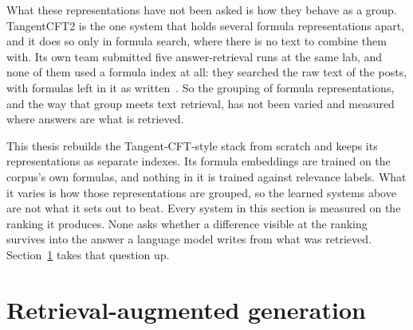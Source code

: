 What these representations have not been asked is how they behave as a group.
TangentCFT2 is the one system that holds several formula representations apart, and it
does so only in formula search, where there is no text to combine them with. Its own
team submitted five answer-retrieval runs at the same lab, and none of them used a
formula index at all: they searched the raw text of the posts, with formulas left in it
as written~\cite{mansouri2022dprl}. So the grouping of formula representations, and the
way that group meets text retrieval, has not been varied and measured where answers are
what is retrieved.

This thesis rebuilds the Tangent-CFT-style stack from scratch and keeps its
representations as separate indexes. Its formula embeddings are trained on the corpus's
own formulas, and nothing in it is trained against relevance labels. What it varies is
how those representations are grouped, so the learned systems above are not what it sets
out to beat. Every system in this section is measured on the ranking it produces. None
asks whether a difference visible at the ranking survives into the answer a language
model writes from what was retrieved. Section~\ref{sec:rw-rag} takes that question up.


\section{Retrieval-augmented generation}\label{sec:rw-rag}

